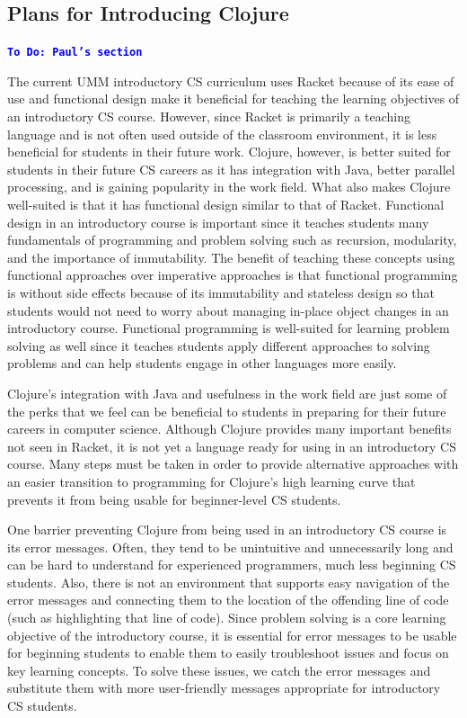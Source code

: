 \documentclass[12pt]{article}
\newcommand{\comment}[1]{{\bf \tt  {#1}}}
\newcommand{\todo}[1]{\textcolor{blue}{\comment{To Do: {#1}}}}
\begin{document}
\subsection{Plans for Introducing Clojure}\label{subsec:plans}
\todo{Paul's section}

The current UMM introductory CS curriculum uses Racket because of its ease of use and functional design make it beneficial for teaching the learning objectives of an introductory CS course.  However, since Racket is primarily a teaching language and is not often used outside of the classroom environment, it is less beneficial for students in their future work. Clojure, however, is better suited for students in their future CS careers as it has integration with Java, better parallel processing, and is gaining popularity in the work field. What also makes Clojure well-suited is that it has functional design similar to that of  Racket. Functional design in an introductory course is important since it teaches students many fundamentals of programming and problem solving such as recursion, modularity, and the importance of immutability. The benefit of teaching these concepts using functional approaches over imperative approaches is that functional programming is without side effects because of its immutability and stateless design so that students would not need to worry about managing in-place object changes in an introductory course. Functional programming is well-suited for learning problem solving as well since it teaches students apply different approaches to solving problems and can help students engage in other languages more easily.

Clojure’s integration with Java and usefulness in the work field are just some of the perks that we feel can be beneficial to students in preparing for their future careers in computer science.  Although Clojure provides many important benefits not seen in Racket, it is not yet a language ready for using in an introductory CS course. Many steps must be taken in order to provide alternative approaches with an easier transition to programming for Clojure's high learning curve that prevents it from being usable for beginner-level CS students.

One barrier preventing Clojure from being used in an introductory CS course is its error messages. Often, they tend to be unintuitive and unnecessarily long and can be hard to understand for experienced programmers, much less beginning CS students. Also, there is not an environment that supports easy navigation of the error messages and connecting them to the location of the offending line of code (such as highlighting that line of code). Since problem solving is a core learning objective of the introductory course, it is essential for error messages to be usable for beginning students to enable them to easily troubleshoot issues and focus on key learning concepts. To solve these issues, we catch the error messages and substitute them with more user-friendly messages appropriate for introductory CS students.
\end{document}
